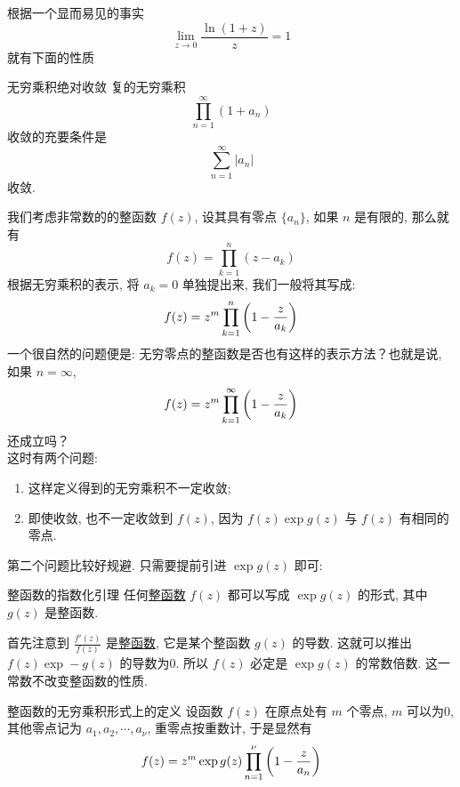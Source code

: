         根据一个显而易见的事实
        \[\lim_{z\to 0}\frac{\ln(1+z)}{z}=1\]
        就有下面的性质

        \begin{ppt}
            {无穷乘积绝对收敛}
            复的无穷乘积
            \[\prod_{n=1}^{\infty}(1+a_n)\]
            收敛的充要条件是
            \[\sum_{n=1}^\infty|a_n|\]
            收敛. 
        \end{ppt}

        我们考虑非常数的的整函数 \(f(z)\), 设其具有零点 \(\{a_n\}\), 如果 \(n\) 是有限的, 那么就有
        \[f(z)=\prod_{k=1}^{n}(z-a_k)\]
        根据无穷乘积的表示, 将 \(a_k=0\) 单独提出来, 我们一般将其写成: 
        \[f(z)=z^m\prod_{k=1}^{n}\qty(1-\frac{z}{a_k})\]
        一个很自然的问题便是: 无穷零点的整函数是否也有这样的表示方法？也就是说, 如果 \(n=\infty\), 
        \[f(z)=z^m\prod_{k=1}^{\infty}\qty(1-\frac{z}{a_k})\]
        还成立吗？\\
        这时有两个问题: 
        
        \begin{enumerate}
            \item 这样定义得到的无穷乘积不一定收敛; 
            \item 即使收敛, 也不一定收敛到 \(f(z)\), 因为 \(f(z)\exp g(z)\) 与 \(f(z)\) 有相同的零点. 
        \end{enumerate}

        第二个问题比较好规避. 只需要提前引进 \(\exp g(z)\) 即可: 

        \begin{thm}
            {整函数的指数化引理}
            任何\hyperref[dfn:Entire-Function]{整函数} \(f(z)\) 都可以写成 \(\exp g(z)\) 的形式, 其中 \(g(z)\) 是整函数.
        \end{thm}

        \begin{prf}
            首先注意到 \(\frac{f'(z)}{f(z)}\) 是\hyperref[dfn:Entire-Function]{整函数}, 它是某个整函数 \(g(z)\) 的导数. 这就可以推出 \(f(z)\exp -g(z)\) 的导数为0. 所以 \(f(z)\) 必定是 \(\exp g(z)\) 的常数倍数. 这一常数不改变整函数的性质. 
        \end{prf}

        \begin{dfn}
            {整函数的无穷乘积形式上的定义}
            设函数 \(f(z)\) 在原点处有 \(m\) 个零点,  \(m\) 可以为0, 其他零点记为 \(a_1,a_2,\cdots, a_\nu\), 重零点按重数计, 于是显然有
            \[f(z)=z^m\exp g(z)\prod_{n=1}^{\nu}\qty(1-\frac{z}{a_n})\]
        \end{dfn}


